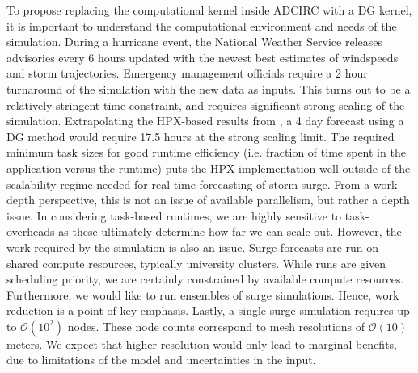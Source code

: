 To propose replacing the computational kernel inside ADCIRC with a DG kernel, it is important to understand the computational environment and needs of the simulation. During a hurricane event, the National Weather Service releases advisories every 6 hours updated with the newest best estimates of windspeeds and storm trajectories. Emergency management officials require a 2 hour turnaround of the simulation with the new data as inputs. This turns out to be a relatively stringent time constraint, and requires significant strong scaling of the simulation. Extrapolating the HPX-based results from \cite{Bremer2019}, a 4 day forecast using a DG method would require 17.5 hours at the strong scaling limit.  The required minimum task sizes for good runtime efficiency (i.e. fraction of time spent in the application versus the runtime) puts the HPX implementation well outside of the scalability regime needed for real-time forecasting of storm surge. 
From a work depth perspective, this is not an issue of available parallelism, but rather a depth issue. In considering task-based runtimes, we are highly sensitive to task-overheads as these ultimately determine how far we can scale out.
 However, the work required by the simulation is also an issue. Surge forecasts are run on shared compute resources, typically university clusters. While runs are given scheduling priority, we are certainly constrained by available compute resources. Furthermore, we would like to run ensembles of surge simulations. Hence, work reduction is a point of key emphasis.
 Lastly, a single surge simulation requires up to $\mathcal{O}(10^2)$ nodes. These node counts correspond to mesh resolutions of $\mathcal{O}(10)$ meters. We expect that higher resolution would only lead to marginal benefits, due to limitations of the model and uncertainties in the input. 


